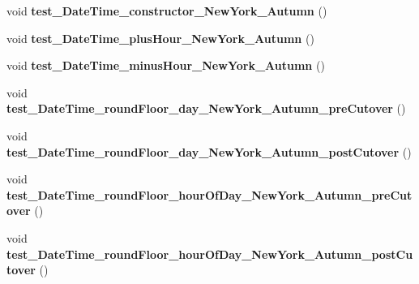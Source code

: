 \begin{DoxyCompactItemize}
\item 
\hypertarget{classorg_1_1joda_1_1time_1_1_test_date_time_zone_cutover_a4dc451c3f56163e4a994a43ce35614c1}{void {\bfseries test\-\_\-\-Date\-Time\-\_\-constructor\-\_\-\-New\-York\-\_\-\-Autumn} ()}\label{classorg_1_1joda_1_1time_1_1_test_date_time_zone_cutover_a4dc451c3f56163e4a994a43ce35614c1}

\item 
\hypertarget{classorg_1_1joda_1_1time_1_1_test_date_time_zone_cutover_aacbcbd913da7a75c023a555bce2bf4bd}{void {\bfseries test\-\_\-\-Date\-Time\-\_\-plus\-Hour\-\_\-\-New\-York\-\_\-\-Autumn} ()}\label{classorg_1_1joda_1_1time_1_1_test_date_time_zone_cutover_aacbcbd913da7a75c023a555bce2bf4bd}

\item 
\hypertarget{classorg_1_1joda_1_1time_1_1_test_date_time_zone_cutover_aba4735a1d43bef62ddf51c6930293008}{void {\bfseries test\-\_\-\-Date\-Time\-\_\-minus\-Hour\-\_\-\-New\-York\-\_\-\-Autumn} ()}\label{classorg_1_1joda_1_1time_1_1_test_date_time_zone_cutover_aba4735a1d43bef62ddf51c6930293008}

\item 
\hypertarget{classorg_1_1joda_1_1time_1_1_test_date_time_zone_cutover_a3f047bfa4bab8cb14ff38e2b873764d5}{void {\bfseries test\-\_\-\-Date\-Time\-\_\-round\-Floor\-\_\-day\-\_\-\-New\-York\-\_\-\-Autumn\-\_\-pre\-Cutover} ()}\label{classorg_1_1joda_1_1time_1_1_test_date_time_zone_cutover_a3f047bfa4bab8cb14ff38e2b873764d5}

\item 
\hypertarget{classorg_1_1joda_1_1time_1_1_test_date_time_zone_cutover_a09b8f5dde1fc6e0e23b69221c9a58f02}{void {\bfseries test\-\_\-\-Date\-Time\-\_\-round\-Floor\-\_\-day\-\_\-\-New\-York\-\_\-\-Autumn\-\_\-post\-Cutover} ()}\label{classorg_1_1joda_1_1time_1_1_test_date_time_zone_cutover_a09b8f5dde1fc6e0e23b69221c9a58f02}

\item 
\hypertarget{classorg_1_1joda_1_1time_1_1_test_date_time_zone_cutover_a7241683eae4551ff50b9d365b1c24d51}{void {\bfseries test\-\_\-\-Date\-Time\-\_\-round\-Floor\-\_\-hour\-Of\-Day\-\_\-\-New\-York\-\_\-\-Autumn\-\_\-pre\-Cutover} ()}\label{classorg_1_1joda_1_1time_1_1_test_date_time_zone_cutover_a7241683eae4551ff50b9d365b1c24d51}

\item 
\hypertarget{classorg_1_1joda_1_1time_1_1_test_date_time_zone_cutover_a7dd8c4f8ae8d5bb861f2dbad0433f0e1}{void {\bfseries test\-\_\-\-Date\-Time\-\_\-round\-Floor\-\_\-hour\-Of\-Day\-\_\-\-New\-York\-\_\-\-Autumn\-\_\-post\-Cutover} ()}\label{classorg_1_1joda_1_1time_1_1_test_date_time_zone_cutover_a7dd8c4f8ae8d5bb861f2dbad0433f0e1}


\end{DoxyCompactItemize}
